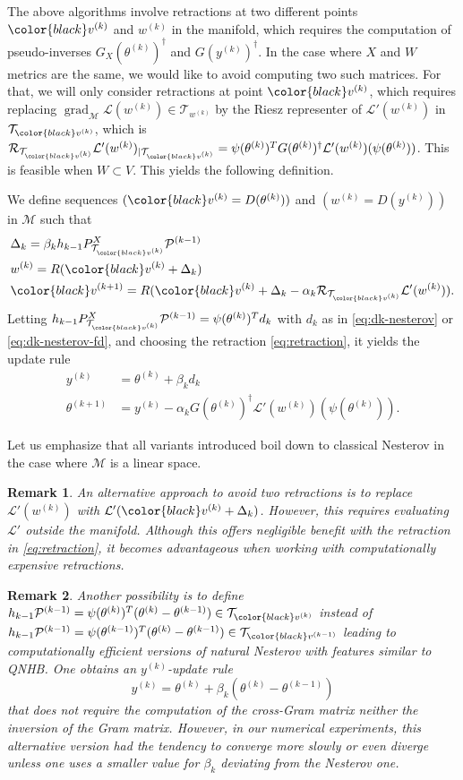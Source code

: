 \documentclass{article}
\theoremstyle{noparens}
\newtheorem{remark}{Remark}[section]
\newcommand{\cL}{\mathcal{L}}
\newcommand{\cT}{\mathcal{T}}
\newcommand{\cM}{\mathcal{M}}
\newcommand{\cP}{\mathcal{P}}
\newcommand{\colorM}{\color{black}}
\newcommand{\paramk}{\theta^{(k)}}
\newcommand{\paramkm}{\theta^{(k-1)}}
\newcommand{\paramkp}{\theta^{(k+1)}}
\newcommand{\yk}{y^{(k)}}
\newcommand{\wk}{w^{(k)}}
\newcommand{\vk}{{\colorM v^{(k)}}}
\newcommand{\vkm}{{\colorM v^{(k-1)}}}
\newcommand{\vkp}{{\colorM v^{(k+1)}}}
\newcommand{\gradM}{\operatorname{grad}_{\cM}}
\begin{document}
The above algorithms involve retractions at two different points $\vk$ and $\wk$ in the manifold, which requires the computation of pseudo-inverses $G_X(\paramk)^\dagger$ and $G(\yk)^\dagger$. In the case where $X$ and $W$ metrics are the same, we would like to avoid computing two such matrices. For that, we will only consider retractions at point $\vk$, which requires replacing $\gradM \cL(\wk) \in \cT_{\wk}$ by the Riesz representer of $\cL'(\wk)$ in $\cT_{\vk}$, which is  $\mathcal{R}_{\cT_{\vk}} \cL'(\wk)_{\mid \cT_{\vk}} = \psi(\paramk)^T G(\paramk)^\dagger \cL'(\wk)(\psi(\paramk))$. This is feasible when $W \subset V$.
This yields the following definition. 
\begin{definition}
We define sequences $(\vk = D(\paramk))$ and $(\wk=D(\yk))$ in $\cM$ such that
\begin{align*}
&\Delta_k = \beta_k  h_{k-1}    P^X_{\cT_{\vk}}\cP^{(k-1)} \\
&\wk = R(\vk + \Delta_k )    \\
&\vkp = R(\vk + \Delta_k - \alpha_k \mathcal{R}_{\cT_{\vk}} \cL'(\wk)).
\end{align*}
Letting $h_{k-1}P^X_{\cT_{\vk}}\cP^{(k-1)} = \psi(\paramk)^T d_k$ with $d_k$ as in \eqref{eq:dk-nesterov} or \eqref{eq:dk-nesterov-fd}, and choosing
the retraction \eqref{eq:retraction}, it yields the update rule
\begin{align*}
\yk &= \paramk + \beta_k d_k
\\
\paramkp &= \yk - \alpha_k G(\paramk)^\dagger \cL'(\wk)(\psi(\paramk)).
\end{align*}
\end{definition}

Let us emphasize that all variants introduced boil down to classical Nesterov in the case where $\cM$ is a linear space.


\begin{remark}
\label{rmk:nesterov-tangent}
An alternative approach to avoid two retractions is to replace $\cL'(\wk)$ with $\cL'(\vk + \Delta_k)$. However, this requires evaluating $\cL'$ outside the manifold. Although this offers negligible benefit with the retraction in \eqref{eq:retraction}, it becomes advantageous when working with computationally expensive retractions.
\end{remark}



\begin{remark}
\label{rmk:quasi-nesterov}
 Another possibility is to define ${h_{k-1}} \cP^{(k-1)} = \psi(\paramk)^T (\paramk-\paramkm) \in \cT_{\vk}$ instead of ${h_{k-1}} \cP^{(k-1)} = \psi(\paramkm)^T (\paramk-\paramkm) \in \cT_{\vkm}$ leading to computationally efficient versions of natural Nesterov with features similar to QNHB. One obtains an $\yk$-update rule
 $$\yk=\paramk + \beta_k(\paramk-\paramkm)$$
 that does not require the computation of the cross-Gram matrix neither the inversion of the Gram matrix. However, in our numerical experiments, this alternative version had the tendency to converge  more slowly or even diverge unless one uses a smaller value for $\beta_k$ deviating from the Nesterov one.
\end{remark}
\end{document}

